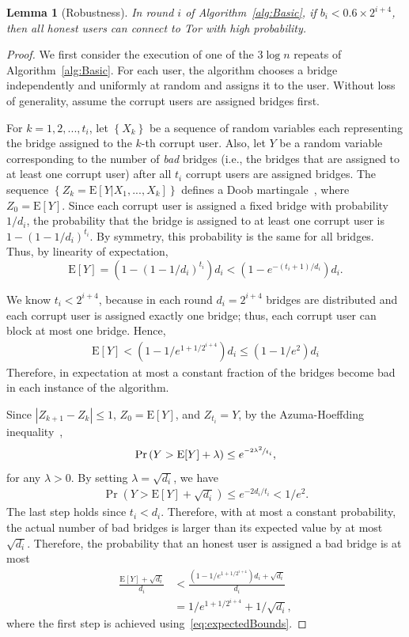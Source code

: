\documentclass{sig-alternate-05-2015}
\newcommand{\ie}{i.e.}
\newcommand{\E}{\mathbf{\mathrm{E}}}
\newtheorem{lemma}{Lemma}
\newcommand{\sfsize}{\fontsize{0.8\baselineskip}{0.68\baselineskip}\selectfont}
\newcommand{\sans}[1]{\textsf{\sfsize \mbox{#1}}}
\begin{document}
\begin{lemma}[\sans{Robustness}] \label{lem:robustness}
	In round $i$ of Algorithm~\ref{alg:Basic}, if ${b_i < 0.6 \times 2^{i+4}}$, then all honest users can connect to Tor with high probability.
\end{lemma}
\begin{proof}
	We first consider the execution of one of the $3\log{n}$ repeats of Algorithm~\ref{alg:Basic}. For each user, the algorithm chooses a bridge independently and uniformly at random and assigns it to the user. Without loss of generality, assume the corrupt users are assigned bridges first.
	
	For ${k=1,2,...,t_i}$, let $\left\{X_k\right\}$ be a sequence of random variables each representing the bridge assigned to the $k$-th corrupt user. Also, let $Y$ be a random variable corresponding to the number of \emph{bad} bridges (\ie, the bridges that are assigned to at least one corrupt user) after all $t_i$ corrupt users are assigned bridges. The sequence ${\left\{Z_k = \E[Y|X_1,...,X_k]\right\}}$ defines a Doob martingale~\cite[Chapter~5]{dubhashi:2009}, where ${Z_0 = \E[Y]}$. 
	Since each corrupt user is assigned a fixed bridge with probability $1/d_i$, the probability that the bridge is assigned to at least one corrupt user is ${1-(1-1/d_i)^{t_i}}$. By symmetry, this probability is the same for all bridges. Thus, by linearity of expectation,
	\[\E[Y] = \left(1 - \left(1-1/d_i\right)^{t_i}\right)d_i < (1 - e^{-(t_i+1)/d_i})d_i.\]
	
	We know ${t_i < 2^{i+4}}$, because in each round ${d_i = 2^{i+4}}$ bridges are distributed and each corrupt user is assigned exactly one bridge; thus, each corrupt user can block at most one bridge. Hence, 
	\begin{align}
		\E[Y] < (1 - 1/e^{1+1/2^{i+4}})d_i \leq (1 - 1/e^2)d_i \label{eq:expectedBounds}
	\end{align}
	Therefore, in expectation at most a constant fraction of the bridges become bad in each instance of the algorithm. 
	
	Since ${|Z_{k+1} - Z_k| \leq 1}$, ${Z_0 = \E[Y]}$, and ${Z_{t_i} = Y}$, by the Azuma-Hoeffding inequality~\cite[Theorem 5.2]{dubhashi:2009},
	\[\Pr\left(Y > \E[Y] + \lambda\right) \leq e^{\nicefrac{-2\lambda^2}{t_i}},\]
	for any ${\lambda > 0}$. 
	By setting ${\lambda = \sqrt{d_i}}$, we have
	\begin{align}
		\Pr(Y > \E[Y] + \sqrt{d_i}) \leq e^{-2d_i/t_i} < 1/e^2. \label{eq:p1}
	\end{align}
	The last step holds since ${t_i < d_i}$. Therefore, with at most a constant probability, the actual number of bad bridges is larger than its expected value by at most $\sqrt{d_i}$. Therefore, the probability that an honest user is assigned a bad bridge is at most
	\begin{align}
		\frac{\E[Y] + \sqrt{d_i}}{d_i} &< \frac{(1-1/e^{1+1/2^{i+4}})d_i + \sqrt{d_i}}{d_i} \nonumber \\ &= 1/e^{1+1/2^{i+4}} + 1/\sqrt{d_i}, \label{eq:p2}
	\end{align}
	where the first step is achieved using~\eqref{eq:expectedBounds}.
	

\end{proof}
\end{document}
